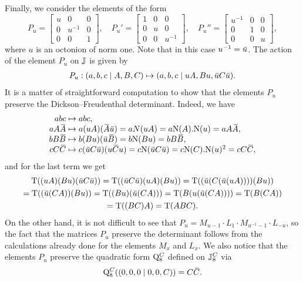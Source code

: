 Finally, we consider the elements of the form 
\begin{equation}
	P_u = \begin{bmatrix}
		u & 0 & 0 \\
		0 & u^{-1} & 0 \\
		0 & 0 & 1
	\end{bmatrix},\quad 
	P_u' = \begin{bmatrix}
		1 & 0 & 0 \\
		0 & u & 0 \\
		0 & 0 & u^{-1}
	\end{bmatrix},\quad 
	P_u'' = \begin{bmatrix}
		u^{-1} & 0 & 0 \\
		0 & 1 & 0 \\
		0 & 0 & u
	\end{bmatrix},
\end{equation}
where $u$ is an octonion of norm one. Note that in this case $u^{-1} = \mathord{\mbox{\hspace*{0pt}}\,\overline{\!u\!\!\;}\!\:}\mbox{\hspace*{0pt}}$. The action of the element $P_u$ on $\mathbb{J}$ is given by
\begin{equation}
    \begin{array}{r@{\;}c@{\;}l}
	P_u: (a,b,c\mid A, B, C) & \mapsto & (a,b,c\mid uA, Bu, \ovu  C \ovu ).
    \end{array}
\end{equation}
It is a matter of straightforward computation to show that the elements $P_u$ preserve
the Dickson--Freudenthal determinant. Indeed, we have
\begin{equation}
    \begin{array}{r@{\;}c@{\;}l}
	abc & \mapsto & abc, \\
	a A \ovA  & \mapsto & a(uA)(\ovA \ovu ) = aN(uA) = a\NN(A).\NN(u) = a A\ovA , \\
	b B \ovB  & \mapsto & b(B u)(\ovu  \ovB ) = b\NN(B u) = b B \ovB , \\
	c C \ovC  & \mapsto & c(\ovu  C \ovu )(u \ovC  u) =
	    c\NN(\ovu  C \ovu  ) = c \NN(C).\NN(u)^2 = c C \ovC ,
    \end{array}
\end{equation}
and for the last term we get
\begin{multline}
    \Tr((uA)(Bu)(\ovu  C\ovu  )) = \Tr((\ovu  C\ovu  )(uA)(Bu)) =
    \Tr((\ovu  (C(\ovu  (uA))))(Bu)) \\
    = \Tr((\ovu  (CA))(Bu)) = \Tr((Bu)(\ovu  (CA))) = \Tr(B(u(\ovu  (CA)))) = \Tr(B(CA))  \\
    = \Tr((BC)A) = \Tr(ABC).
\end{multline}
On the other hand, it is not difficult to see that $P_u = M_{u-1} \cdot L_1 \cdot M_{u^{-1}-1} \cdot L_{-u}$,
so the fact that the matrices $P_u$ preserve the determinant follows from the calculations already done for
the elements $M_x$ and $L_x$. We also notice that the elements $P_u$ preserve
the quadratic form $\mathord{\mathrm{Q}}_8^C$ defined on $\mathbb{J}_8^C$ via
\begin{equation}
	\mathord{\mathrm{Q}}_8^C( (0,0,0\mid 0,0,C) ) = C\mathord{\mbox{\hspace*{0pt}}\,\overline{\!C\!\!\;}\!\:}\mbox{\hspace*{0pt}}.
\end{equation}

